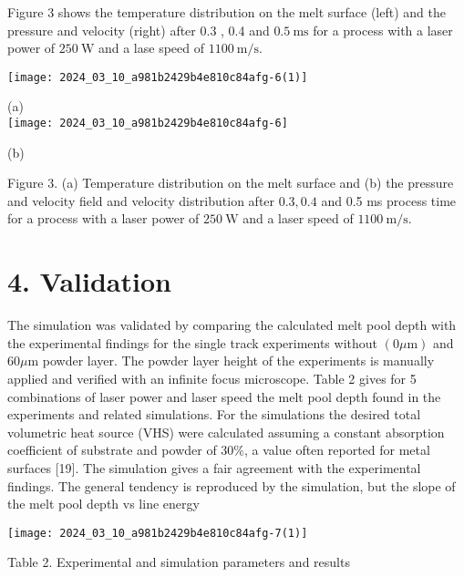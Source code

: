 \documentclass[10pt]{article}
\begin{document}
Figure 3 shows the temperature distribution on the melt surface (left) and the pressure and velocity (right) after 0.3 , 0.4 and $0.5 \mathrm{~ms}$ for a process with a laser power of $250 \mathrm{~W}$ and a lase speed of $1100 \mathrm{~m} / \mathrm{s}$.

\begin{center}
\texttt{[image: 2024\_03\_10\_a981b2429b4e810c84afg-6(1)]}
\end{center}

(a)\\
\texttt{[image: 2024\_03\_10\_a981b2429b4e810c84afg-6]}

(b)

Figure 3. (a) Temperature distribution on the melt surface and (b) the pressure and velocity field and velocity distribution after $0.3,0.4$ and 0.5 ms process time for a process with a laser power of $250 \mathrm{~W}$ and a laser speed of $1100 \mathrm{~m} / \mathrm{s}$.

\section*{4. Validation}
The simulation was validated by comparing the calculated melt pool depth with the experimental findings for the single track experiments without $(0 \mu \mathrm{m})$ and $60 \mu \mathrm{m}$ powder layer. The powder layer height of the experiments is manually applied and verified with an infinite focus microscope. Table 2 gives for 5 combinations of laser power and laser speed the melt pool depth found in the experiments and related simulations. For the simulations the desired total volumetric heat source (VHS) were calculated assuming a constant absorption coefficient of substrate and powder of $30 \%$, a value often reported for metal surfaces [19]. The simulation gives a fair agreement with the experimental findings. The general tendency is reproduced by the simulation, but the slope of the melt pool depth vs line energy

\begin{center}
\texttt{[image: 2024\_03\_10\_a981b2429b4e810c84afg-7(1)]}
\end{center}

Table 2. Experimental and simulation parameters and results
\end{document}
